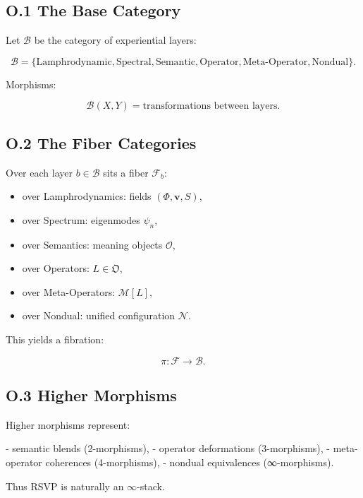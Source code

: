\documentclass[12pt]{article}
\begin{document}
\subsection*{O.1 The Base Category}

Let $\mathcal{B}$ be the category of experiential layers:

\[
\mathcal{B}
=
\{
\text{Lamphrodynamic},
\text{Spectral},
\text{Semantic},
\text{Operator},
\text{Meta-Operator},
\text{Nondual}
\}.
\]

Morphisms:

\[
\mathcal{B}(X,Y)
=
\text{transformations between layers}.
\]

\subsection*{O.2 The Fiber Categories}

Over each layer $b \in \mathcal{B}$ sits a fiber $\mathcal{F}_b$:

\begin{itemize}
    \item over Lamphrodynamics: fields $(\Phi,\mathbf{v},S)$,
    \item over Spectrum: eigenmodes $\psi_n$,
    \item over Semantics: meaning objects $\mathcal{O}$,
    \item over Operators: $L \in \mathfrak{O}$,
    \item over Meta-Operators: $\mathcal{M}[L]$,
    \item over Nondual: unified configuration $\mathcal{N}$.
\end{itemize}

This yields a fibration:

\[
\pi: \mathcal{F} \to \mathcal{B}.
\]

\subsection*{O.3 Higher Morphisms}

Higher morphisms represent:

- semantic blends (2-morphisms),
- operator deformations (3-morphisms),
- meta-operator coherences (4-morphisms),
- nondual equivalences (∞-morphisms).

Thus RSVP is naturally an $\infty$-stack.
\end{document}
